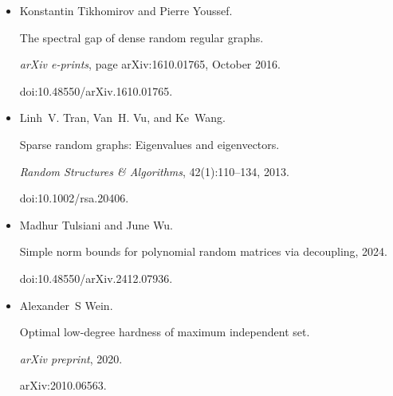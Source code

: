 \begin{itemize}
Tselil Schramm and Alexander S. Wein.


Computational barriers to estimation from low-degree polynomials.


\emph{The Annals of Statistics}, 50(3), June 2022.


doi:10.1214/22-aos2179.





\item[] 
[45]

Konstantin Tikhomirov and Pierre Youssef.


The spectral gap of dense random regular graphs.


\emph{arXiv e-prints}, page arXiv:1610.01765, October 2016.


doi:10.48550/arXiv.1610.01765.





\item[] 
[46]

Linh V. Tran, Van H. Vu, and Ke Wang.


Sparse random graphs: Eigenvalues and eigenvectors.


\emph{Random Structures \& Algorithms}, 42(1):110–134, 2013.


doi:10.1002/rsa.20406.





\item[] 
[47]

Madhur Tulsiani and June Wu.


Simple norm bounds for polynomial random matrices via decoupling,
2024.


doi:10.48550/arXiv.2412.07936.





\item[] 
[48]

Alexander S Wein.


Optimal low-degree hardness of maximum independent set.


\emph{arXiv preprint}, 2020.


arXiv:2010.06563.





\end{itemize}

